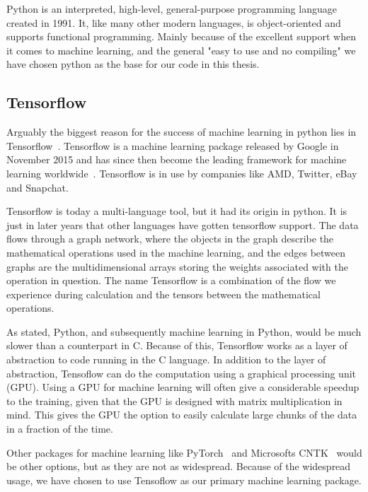Python is an interpreted, high-level, general-purpose programming language created in 1991.   It, like many other modern languages, is object-oriented and supports functional programming. 
Mainly because of the excellent support when it comes to machine learning, and the general "easy to use and no compiling" we have chosen python as the base for our code in this thesis. 



\subsection{Tensorflow}
Arguably the biggest reason for the success of machine learning in python lies in Tensorflow~\cite{tensorflow2015-whitepaper}. Tensorflow is a machine learning package released by Google in November 2015 and has since then become the leading framework for machine learning worldwide~\cite{kaggle}.  
Tensorflow is in use by companies like AMD, Twitter, eBay and Snapchat. 


Tensorflow is today a multi-language tool, but it had its origin in python. It is just in later years that other languages have gotten tensorflow support.  
The data flows through a graph network, where the objects in the graph describe the mathematical operations used in the machine learning, and the edges between graphs are the multidimensional arrays storing the weights associated with the operation in question. The name Tensorflow is a combination of the flow we experience during calculation and the tensors between the mathematical operations. 

As stated, Python, and subsequently machine learning in Python, would be much slower than a counterpart in C. Because of this, Tensorflow works as a layer of abstraction to code running in the C language. 
In addition to the layer of abstraction, Tensoflow can do the computation using a graphical processing unit (GPU). Using a GPU for machine learning will often give a considerable speedup to the training, given that the GPU is designed with matrix multiplication in mind. This gives the GPU the option to easily calculate large chunks of the data in a fraction of the time.

Other packages for machine learning like PyTorch~\cite{paszke2017automatic} and Microsofts CNTK~\cite{Seide:2016:CMO:2939672.2945397} would be other options, but as they are not as widespread. Because of the widespread usage, we have chosen to use Tensoflow as our primary machine learning package.



